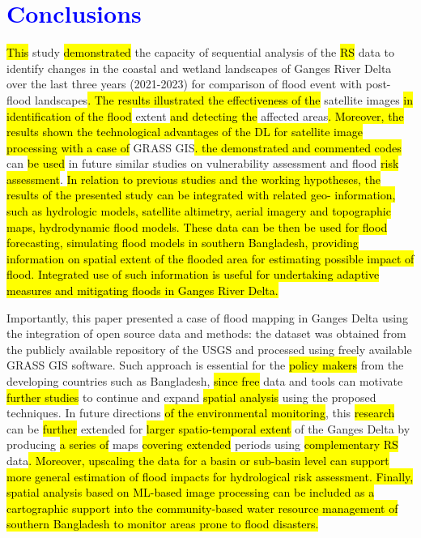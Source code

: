 \documentclass[water,article,submit,pdftex,moreauthors]{Definitions/mdpi}
\begin{document}
\section{\textcolor{blue}{Conclusions}}
\hl{This} study \hl{demonstrated} the capacity of sequential analysis of the \hl{RS} data to identify changes in the coastal and wetland landscapes of Ganges River Delta over the last three years (2021-2023) for comparison of flood event with post-flood landscapes\hl{. The results illustrated the effectiveness of the} satellite images \hl{in identification of the flood} extent \hl{and detecting the} affected areas\hl{. Moreover, the results shown the technological advantages of the DL for satellite image processing with a case of}  GRASS GIS\hl{. the demonstrated and commented codes }can \hl{be used} in future\hl{ }similar studies on vulnerability assessment and\hl{ }flood \hl{risk assessment}. \hl{In relation to previous studies and the working hypotheses, the results of the presented study can be integrated with related geo- information, such as hydrologic models, satellite altimetry, aerial imagery and topographic maps, hydrodynamic flood models. These data can be then be used for flood forecasting, simulating flood models in southern Bangladesh, providing information on spatial extent of the flooded area for estimating possible impact of flood. Integrated use of such information is useful  for undertaking adaptive measures and mitigating floods in Ganges River Delta.}

Importantly, this paper presented a case of flood mapping in Ganges Delta using the integration of open source data and methods: the dataset was obtained from the publicly available repository of the USGS and processed using freely available GRASS GIS software. Such approach is essential for the \hl{policy makers} from the developing countries such as Bangladesh, \hl{since free} data and tools can motivate \hl{further studies} to continue and expand \hl{spatial analysis} using the proposed techniques. In future directions \hl{of the environmental monitoring}, this \hl{research} can be \hl{further }extended for \hl{larger spatio-temporal extent }of the Ganges Delta by producing \hl{a series of }maps \hl{covering extended} periods using \hl{complementary RS} data\hl{. Moreover, upscaling the data for a basin or sub-basin level can support more general estimation of flood impacts for hydrological risk assessment. Finally, spatial analysis based on ML-based image processing can be included as a cartographic support into the community-based water resource management of southern Bangladesh to monitor areas prone to flood disasters.}
\end{document}

